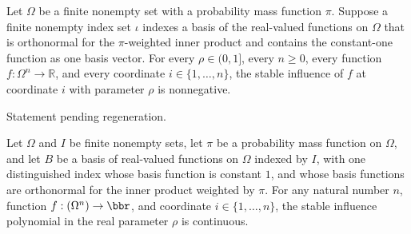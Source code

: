 \begin{theorem}
\label{FABL.productStableInfluence_nonneg}
\leanok
{}
Let $\Omega$ be a finite nonempty set with a probability mass function $\pi$. Suppose a
finite nonempty index set $\iota$ indexes a basis of the real-valued functions on
$\Omega$ that is orthonormal for the $\pi$-weighted inner product and contains the
constant-one function as one basis vector. For every $\rho\in(0,1]$, every $n\ge 0$,
every function $f:\Omega^n\to\mathbb{R}$, and every coordinate $i\in\{1,\ldots,n\}$, the
stable influence of $f$ at coordinate $i$ with parameter $\rho$ is nonnegative.
\end{theorem}

\begin{theorem}
\label{FABL.FiniteFourierBasis.productTotalStableInfluence_eq_sum}
\leanok
{}
Statement pending regeneration.
\end{theorem}

\begin{theorem}
\label{FABL.continuous_stableInfluencePolynomial}
\leanok
{}
Let $\Omega$ and $I$ be finite nonempty sets, let $\pi$ be a probability mass function
on $\Omega$, and let $B$ be a basis of real-valued functions on $\Omega$ indexed by
$I$, with one distinguished index whose basis function is constant $1$, and whose basis
functions are orthonormal for the inner product weighted by $\pi$. For any natural
number $n$, function $f:(\Omega^n)\to\bbr$, and coordinate $i\in\{1,\ldots,n\}$,
the stable influence polynomial in the real parameter $\rho$ is continuous.
\end{theorem}

